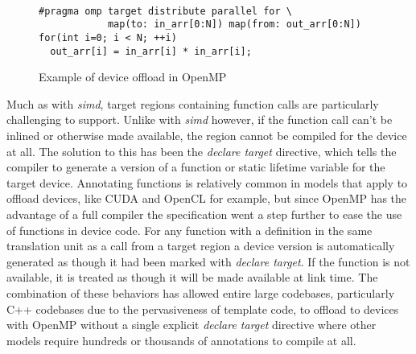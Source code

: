 \begin{figure}
\begin{verbatim}

#pragma omp target distribute parallel for \
            map(to: in_arr[0:N]) map(from: out_arr[0:N])
for(int i=0; i < N; ++i)
  out_arr[i] = in_arr[i] * in_arr[i];
\end{verbatim}
\caption{Example of device offload in OpenMP}
\label{fig:target-loop}
\end{figure}


Much as with \emph{simd}, target regions containing function calls are
particularly challenging to support.  Unlike with \emph{simd} however, if the
function call can't be inlined or otherwise made available, the region cannot be
compiled for the device at all.  The solution to this has been the \emph{declare
target} directive, which tells the compiler to generate a version of a function
or static lifetime variable for the target device.  Annotating functions is relatively
common in models that apply to offload devices, like CUDA and OpenCL for
example, but since OpenMP has the advantage of a full compiler the specification
went a step further to ease the use of functions in device code.  For any
function with a definition in the same translation unit as a call from a target
region a device version is automatically generated as though it had been marked
with \emph{declare target}.  If the function is not available, it is treated as
though it will be made available at link time.  The combination of these
behaviors has allowed entire large codebases, particularly C++ codebases due to
the pervasiveness of template code, to offload to devices with OpenMP without
a single explicit \emph{declare target} directive where other models require
hundreds or thousands of annotations to compile at all.



